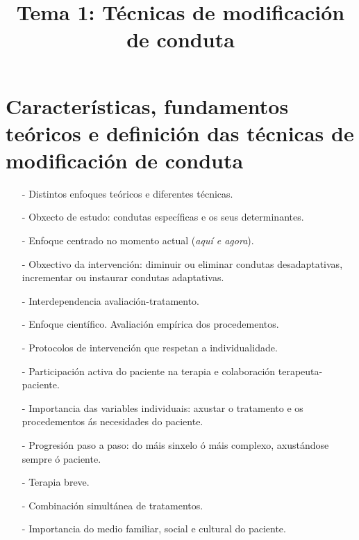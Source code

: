 \documentclass[a4paper,11pt]{article}
\title{Tema 1: Técnicas de modificación de conduta}
\date{}
\begin{document}
   

\maketitle 

\section{Características, fundamentos teóricos e definición das técnicas de modificación de conduta}
\begin{itemize}
	\item[-] Distintos enfoques teóricos e diferentes técnicas.
	\item[-] Obxecto de estudo: condutas específicas e os seus determinantes.
	\item[-] Enfoque centrado no momento actual (\textit{aquí e agora}).
	\item[-] Obxectivo da intervención: diminuir ou eliminar condutas desadaptativas, incrementar ou 
	instaurar condutas adaptativas. 
	\item[-] Interdependencia avaliación-tratamento.
	\item[-] Enfoque científico. Avaliación empírica dos procedementos.
	\item[-] Protocolos de intervención que respetan a individualidade.
	\item[-] Participación activa do paciente na terapia e colaboración terapeuta-paciente. 
	\item[-] Importancia das variables individuais: axustar o tratamento e os procedementos ás 
	necesidades do paciente. 
	\item[-] Progresión paso a paso: do máis sinxelo ó máis complexo, axustándose sempre ó paciente.
	\item[-] Terapia breve.
	\item[-] Combinación simultánea de tratamentos. 
	\item[-] Importancia do medio familiar, social e cultural do paciente. 
\end{itemize}
\end{document}
